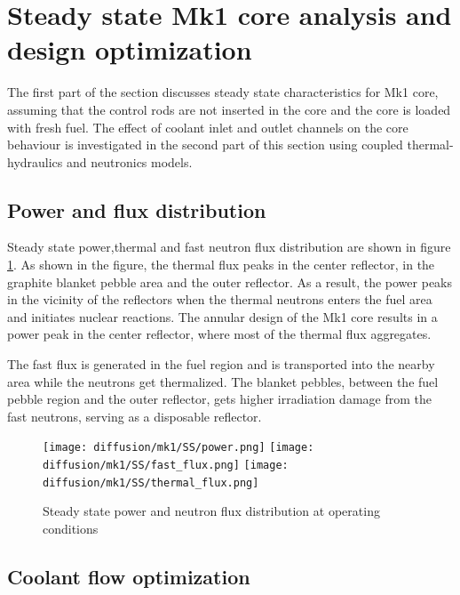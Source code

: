 \documentclass{elsarticle}
\begin{document}
\newpage
\section{Steady state Mk1 core analysis and design optimization}
\label{sec:mk1_ss}

The first part of the section discusses steady state characteristics for Mk1 core, assuming that the control rods are not inserted in the core and the core is loaded with fresh fuel. The effect of coolant inlet and outlet channels on the core behaviour is investigated in the second part of this section using coupled thermal-hydraulics and neutronics models. 




\subsection{Power and flux distribution}

Steady state power,thermal and fast neutron flux distribution are shown in figure \ref{fig:mk1_flux}. 
As shown in the figure, the thermal flux peaks in the center reflector, in the graphite blanket pebble area and the outer reflector. As a result, the power peaks in the vicinity of the reflectors when the thermal neutrons enters the fuel area and initiates nuclear reactions. The annular design of the Mk1 core results in a power peak in the center reflector, where most of the thermal flux aggregates. %

The fast flux is generated in the fuel region and is transported into the nearby area while the neutrons get thermalized. The blanket pebbles, between the fuel pebble region and the outer reflector, gets higher irradiation damage from the fast neutrons, serving as a disposable reflector.

\begin{figure}
\centering 
    \texttt{[image: diffusion/mk1/SS/power.png]}
  \texttt{[image: diffusion/mk1/SS/fast\_flux.png]}
  \texttt{[image: diffusion/mk1/SS/thermal\_flux.png]}
  \caption{Steady state power and neutron flux distribution at operating conditions}
  \label{fig:mk1_flux}
\end{figure}






\subsection{Coolant flow optimization}
\label{sec:pressure}
\end{document}
